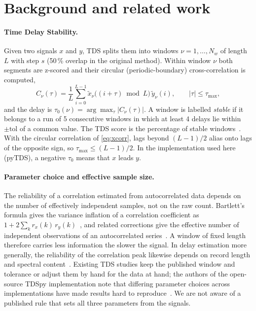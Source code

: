 \documentclass[11pt,a4paper]{article}
\newcommand{\tmax}{\tau_{\max}}
\newcommand{\tol}{\mathrm{tol}}
\begin{document}
\section{Background and related work}
\label{sec:related}

\paragraph{Time Delay Stability.} Given two signals $x$ and $y$, TDS splits them into windows $\nu = 1, \dots, N_w$ of length $L$ with step $s$ (50\,\% overlap in the original method). Within window $\nu$ both segments are z-scored and their circular (periodic-boundary) cross-correlation is computed,
\begin{equation}
C_\nu(\tau) = \frac{1}{L} \sum_{i=0}^{L-1} \tilde{x}_\nu\big((i+\tau) \bmod L\big)\, \tilde{y}_\nu(i), \qquad |\tau| \le \tmax ,
\label{eq:xcorr}
\end{equation}
and the delay is $\tau_0(\nu) = \arg\max_\tau |C_\nu(\tau)|$. A window is labelled \emph{stable} if it belongs to a run of 5 consecutive windows in which at least 4 delays lie within $\pm\tol$ of a common value. The TDS score is the percentage of stable windows~\cite{bashan2012network,bartsch2015network}. With the circular correlation of \cref{eq:xcorr}, lags beyond $(L-1)/2$ alias onto lags of the opposite sign, so $\tmax \le (L-1)/2$. In the implementation used here (pyTDS), a negative $\tau_0$ means that $x$ leads $y$.

\paragraph{Parameter choice and effective sample size.} The reliability of a correlation estimated from autocorrelated data depends on the number of effectively independent samples, not on the raw count. Bartlett's formula gives the variance inflation of a correlation coefficient as $1 + 2\sum_k r_x(k)\, r_y(k)$~\cite{bartlett1946theoretical}, and related corrections give the effective number of independent observations of an autocorrelated series~\cite{bayley1946effective}. A window of fixed length therefore carries less information the slower the signal. In delay estimation more generally, the reliability of the correlation peak likewise depends on record length and spectral content~\cite{knapp1976generalized}. Existing TDS studies keep the published window and tolerance or adjust them by hand for the data at hand; the authors of the open-source TDSpy implementation note that differing parameter choices across implementations have made results hard to reproduce~\cite{steinbrinker2024tdspy}. We are not aware of a published rule that sets all three parameters from the signals.
\end{document}
